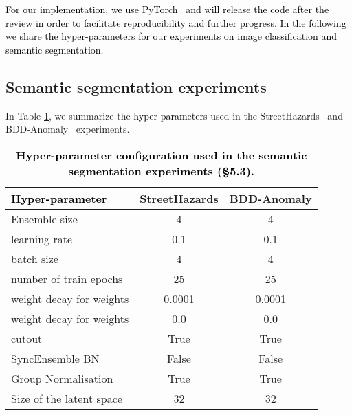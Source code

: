 \documentclass[10pt,twocolumn,letterpaper]{article}
\newcommand{\ab}[1]{\textcolor{black}{#1}}
\begin{document}
\ab{For our implementation, we use PyTorch~\cite{paszke2019pytorch} and will release the code after the review in order to facilitate reproducibility and further progress. In the following we share the hyper-parameters for our experiments on image classification and semantic segmentation.}

\subsection{Semantic segmentation experiments}
{In Table \ref{table:tab3}, we summarize the \ab{hyper-parameters} used in the StreetHazards~\cite{hendrycks2019anomalyseg} and BDD-Anomaly~\cite{hendrycks2019anomalyseg} experiments. }



\begin{table}[t!]
\renewcommand{\figurename}{Table}
\renewcommand{\captionfont}{\small}
\begin{center}
\scalebox{0.85}
{
\begin{tabular}{l|c|c}
\toprule
  \ab{\textbf{Hyper-parameter}} &   \textbf{StreetHazards} & \textbf{BDD-Anomaly}        \\ 
\midrule
Ensemble size           &4 & 4 \\ 
\midrule
learning rate         &0.1 &0.1 \\ 
 \midrule
batch size        &4 & 4 \\ 
 \midrule
number of train epochs  & 25 & 25 \\ 
\midrule
 weight decay for      weights  &0.0001 & 0.0001 \\ 
 \midrule
  weight decay for     weights   &0.0 & 0.0 \\ 
 \midrule
 cutout         & True& True \\ 
 \midrule
 SyncEnsemble BN        & False & False \\ 
  \midrule
Group Normalisation      & True & True \\ 
  \midrule
 Size of the latent space         & 32 & 32 \\ 
\bottomrule
\end{tabular}
}
\end{center}
\caption{
\ab{\textbf{Hyper-parameter configuration used in the semantic segmentation experiments (\S5.3).
}}
}\label{table:tab3}
\end{table}
\end{document}
